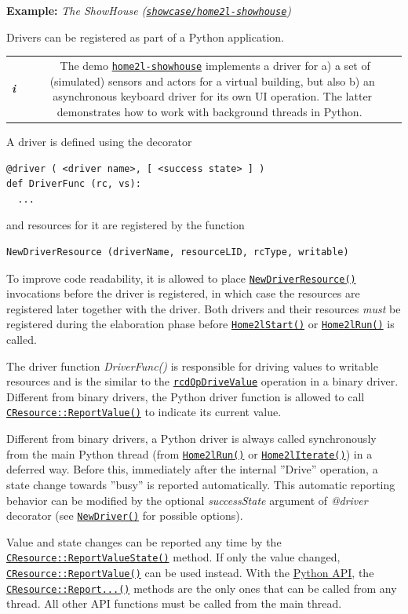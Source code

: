 \documentclass[12pt,english,parskip=half,headheight=19pt]{scrreprt}
\newcommand{\infobox}[1]{
  \par
  \medskip
  \hfill
  \setlength\arrayrulewidth{1pt}
  \begin{tabular}[t]{c|c|}
    \parbox{1.8em}{\hfill\textit{\Huge\textbf{i}\,}}
    &
    \,\parbox{0.89\linewidth}{\setlength{\parskip}{0.5em} \small #1}\,
  \end{tabular}
  \medskip
  \par
}
\newcommand{\idx}[1]{#1\index{#1}}
\newcommand{\reftool}[1]{\hyperref[tool:#1]{\texttt{\idx{#1}}}}
\newcommand{\refdoc}[2]{\href{#1}{#2}}              %
\newcommand{\refsrc}[1]{\href{#1}{\texttt{#1}}}     %
\newcommand{\refapic}[1]{\href{home2l-api_c/index.html}{\mbox{\texttt{#1}}}}            %
\newcommand{\refapipython}[1]{\href{home2l-api_python/index.html}{\mbox{\texttt{#1}}}}  %
\newcommand{\theapipython}{\refdoc{home2l-api_python/index.html}{Python API}}
\begin{document}
\textbf{Example:} \textit{The ShowHouse (\refsrc{showcase/home2l-showhouse})}

Drivers can be registered as part of a Python application.

\infobox{
  The demo \reftool{home2l-showhouse} implements a driver for a) a set of (simulated)
  sensors and actors for a virtual building, but also
  b) an asynchronous keyboard driver for its own UI operation.
  The latter demonstrates how to work with background threads in Python.
}

A driver is defined using the decorator
\begin{lstlisting}
@driver ( <driver name>, [ <success state> ] )
def DriverFunc (rc, vs):
  ...
\end{lstlisting}

and resources for it are registered by the function
\begin{lstlisting}
NewDriverResource (driverName, resourceLID, rcType, writable)
\end{lstlisting}

To improve code readability, it is allowed to place \refapipython{NewDriverResource()} invocations before the driver is registered, in which case the resources are registered later together with the driver. Both drivers and their resources \textit{must} be registered during the elaboration phase before \refapipython{Home2lStart()} or \refapipython{Home2lRun()} is called.

The driver function \textit{DriverFunc()} is responsible for driving values to writable resources and is the similar to the
\refapic{rcdOpDriveValue} operation in a binary driver. Different from binary drivers, the Python driver function is allowed to call \refapic{CResource::ReportValue()} to indicate its current value.

Different from binary drivers, a Python driver is always called synchronously from the main Python thread (from \refapipython{Home2lRun()} or \refapipython{Home2lIterate()}) in a deferred way. Before this, immediately after the internal ''Drive'' operation, a state change towards ''busy'' is reported automatically. This automatic reporting behavior can be modified by the optional \textit{successState} argument of \textit{@driver} decorator (see \refapipython{NewDriver()} for possible options).

Value and state changes can be reported any time by the \refapic{CResource::ReportValueState()} method.
If only the value changed, \refapic{CResource::ReportValue()} can be used instead. With the \theapipython{}, the \refapic{CResource::Report...()} methods are the only ones that can be called from any thread. All other API functions must be called from the main thread.
\end{document}
